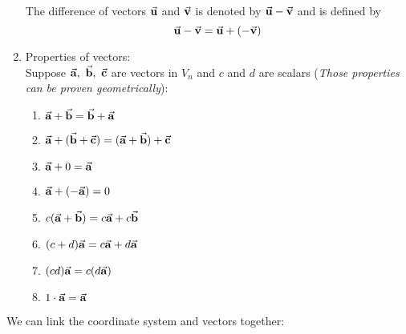\documentclass[12pt,a4paper]{article}
\def\vecv{\va{v}}
\def\vecu{\va{u}}
\def\veca{\va{a}}
\def\vecb{\va{b}}
\def\vecc{\va{c}}
\begin{document}
\begin{enumerate}
\begin{center}
	\end{center}
 	The difference of vectors $\vecu$ and $\vecv$ is denoted by $\vecu-\vecv$ and is defined by \[\vecu-\vecv=\vecu+(-\vecv)\]
 	\item Properties of vectors: \\Suppose $\veca,\ \vecb,\ \vecc$ are vectors in $V_n$ and $c$ and $d$ are scalars (\textit{Those properties can be proven geometrically}): 
 	\begin{enumerate}
 		\item $\veca+\vecb=\vecb+\veca$
 		\item $\veca+(\vecb+\vecc)=(\veca+\vecb)+\vecc$
 		\item $\veca+0=\veca$
 		\item $\veca+(-\veca)=0$
 		\item $c(\veca+\vecb)=c\veca+c\vecb$
 		\item $(c+d)\veca=c\veca+d\veca$
 		\item $(cd)\veca=c(d\veca)$
 		\item $1\cdot\veca=\veca$
 	\end{enumerate}
\end{enumerate}
We can link the coordinate system and vectors together:  
\end{document}
